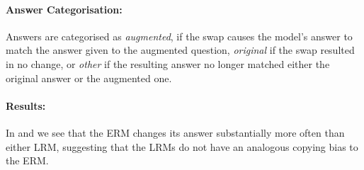 \documentclass[11pt]{article}
\begin{document}
\paragraph{Answer Categorisation:} Answers are categorised as \emph{augmented}, if the swap causes the model's answer to match the answer given to the augmented question, \emph{original} if the swap resulted in no change, or \emph{other} if the resulting answer no longer matched either the original answer or the augmented one.

\paragraph{Results:} In  and  we see that the ERM changes its answer substantially more often than either LRM, suggesting that the LRMs do not have an analogous copying bias to the ERM.



\end{document}
